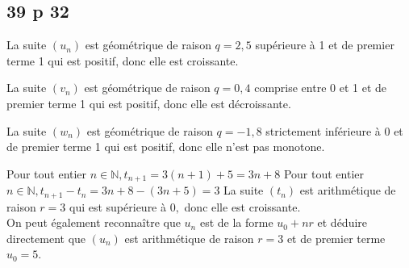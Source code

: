 \documentclass[a4paper,french]{book}
\begin{document}
\subsection*{39 p 32}
\begin{enumMet}
    \item La suite $\left(u_{n}\right)$ est géométrique de raison $q=2,5$ supérieure à 1 et de premier terme 1 qui est positif, donc elle est croissante.
    \item La suite $\left(v_{n}\right)$ est géométrique de raison $q=0,4$ comprise entre 0 et 1 et de premier terme 1 qui est positif, donc elle est décroissante.
    \item La suite $\left(w_{n}\right)$ est géométrique de raison $q=-1,8$ strictement inférieure à 0 et de premier terme 1 qui est positif, donc elle n'est pas monotone.
    \item Pour tout entier $n \in \mathbb{N}, t_{n+1}=3(n+1)+5=3 n+8$
    Pour tout entier $n \in \mathbb{N}, t_{n+1}-t_{n}=3 n+8-(3 n+5)=3$
    La suite $\left(t_{n}\right)$ est arithmétique de raison $r=3$ qui est supérieure à $0,$ donc elle est croissante.\\
     On peut également reconnaître que $u_{n}$ est de la forme $u_{0}+n r$ et déduire directement que $\left(u_{n}\right)$ est arithmétique de raison $r=3$ et de premier terme $u_{0}=5$.
\end{enumMet}
\end{document}
